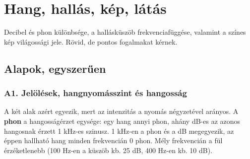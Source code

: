 \setcounter{chapter}{7}
\chapter{\texorpdfstring{Hang, hallás, kép, látás}{Hang, hallás, kép, látás}}\label{f8}
Decibel és phon különbsége, a hallásküszöb frekvenciafüggése, valamint a színes kép világossági jele. Rövid, de pontos fogalmakat kérnek.

\section{Alapok, egyszerűen}
\subsection{\texorpdfstring{A1. Jelölések, hangnyomásszint és hangosság}{A1. Jelölések, hangnyomásszint és hangosság}}\label{a8-hang}
\par{}\par

\begin{center}\end{center}

A két alak azért egyezik, mert az intenzitás a nyomás négyzetével arányos. A \textbf{phon} a hangosságérzet egysége: egy hang annyi phon, ahány dB-es az azonos hangosnak érzett 1 kHz-es szinusz. 1 kHz-en a phon és a dB megegyezik, az éppen hallható hang minden frekvencián 0 phon. Mély frekvencián a fül érzéketlenebb (100 Hz-en a küszöb kb. 25 dB, 400 Hz-en kb. 10 dB).

